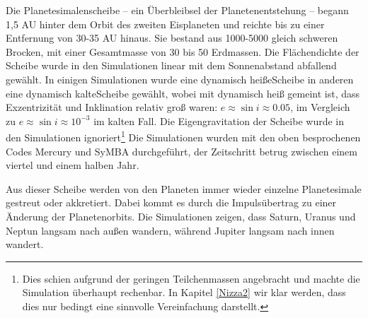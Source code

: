 \documentclass[12pt,a4paper,twoside]{article}
\renewcommand{\cite}{\citep}
\begin{document}
Die Planetesimalenscheibe – ein Überbleibsel der Planetenentstehung – begann 1,5 AU hinter dem Orbit des zweiten Eisplaneten und reichte bis zu einer Entfernung von 30-35 AU hinaus\cite{Tsiganis2005,Levison2008}. Sie bestand aus 1000-5000 gleich schweren Brocken, mit einer Gesamtmasse von 30 bis 50 Erdmassen. %
Die Flächendichte der Scheibe wurde in den Simulationen linear mit dem Sonnenabstand abfallend gewählt. In einigen Simulationen wurde eine \glqq dynamisch heiße\grqq Scheibe in anderen eine \glqq dynamisch kalte\grqq Scheibe gewählt, wobei mit dynamisch heiß gemeint ist, dass Exzentrizität und Inklination relativ groß waren: $e \approx \sin i \approx 0.05 $, im Vergleich zu $e \approx \sin i \approx 10^{-3} $ im kalten Fall\cite{Tsiganis2005}.
Die Eigengravitation der Scheibe wurde in den Simulationen ignoriert\cite{Tsiganis2005}\footnote{Dies schien aufgrund der geringen Teilchenmassen angebracht und machte die Simulation überhaupt rechenbar. In Kapitel \ref{Nizza2} wir klar werden, dass dies nur bedingt eine sinnvolle Vereinfachung darstellt.}
Die Simulationen wurden mit den oben besprochenen Codes Mercury und SyMBA durchgeführt,
der Zeitschritt betrug zwischen einem viertel und einem halben Jahr\cite{Tsiganis2005}.

Aus dieser Scheibe werden von den Planeten immer wieder einzelne Planetesimale gestreut oder akkretiert. Dabei kommt es durch die Impulsübertrag zu einer Änderung der Planetenorbits\cite{Tsiganis2005}. %
Die Simulationen zeigen, dass Saturn, Uranus und Neptun langsam nach außen wandern, während Jupiter langsam nach innen wandert\cite{Hahn1999,Tsiganis2005}.
\end{document}
